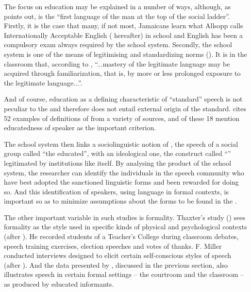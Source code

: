 The focus on education may be explained in a number of ways, although, as \citet[179]{Pollard1998} points out,  is the “first language of the man at the top of the social ladder”.  Firstly, it is the case that many, if not most, Jamaicans learn what Allsopp calls Internationally Acceptable English ( hereafter) in school and English has been a compulsory exam always required by the school system.  Secondly, the school system is one of the means of legitimising and standardizing norms (\citealt[65]{Lippi-Green1997}).  It is in the classroom that, according to \citet[61--62]{Bourdieu1991}, “...mastery of the legitimate language may be acquired through familiarization, that is, by more or less prolonged exposure to the legitimate language...”.

And of course, education as a defining characteristic of “standard” speech is not peculiar to the  and therefore does not entail external origin of the standard.  \citet[119--137]{McArthur1998} cites 52 examples of definitions of  from a variety of sources, and of these 18 mention educatedness of speaker as the important criterion.  

The school system then links a sociolinguistic notion of , the speech of a social group called “the educated”, with an ideological one, the construct called “” legitimated by institutions like itself.  By analysing the product of the school system, the researcher can identify the individuals in the speech community who have best adopted the sanctioned linguistic forms and been rewarded for doing so.  And this identification of speakers, using language in formal contexts, is important so as to minimize assumptions about the forms to be found in the .  

The other important variable in such studies is formality.  Thaxter’s study (\citeyear{Thaxter1977}) sees formality as the style used in specific kinds of physical and psychological contexts (after \citealt[55]{Hymes1974}).  He recorded students of a Teacher’s College during classroom debates, speech training exercises, election speeches and votes of thanks.  F. Miller conducted interviews designed to elicit certain self-conscious styles of speech (after \citealt[79]{Labov1972}).  And the  data presented by \citet[275--276]{Rickford1987}, discussed in the previous section, also illustrates speech in certain formal settings – the courtroom and the classroom – as produced by educated informants.  

